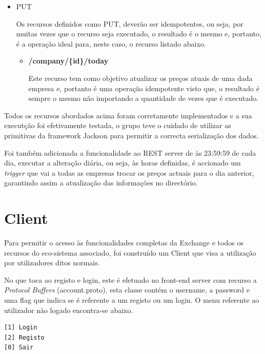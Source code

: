 \documentclass[a4paper,12pt]{article}
\begin{document}
\begin{itemize}
\begin{itemize}
    
  \end{itemize}
\item PUT
  \par Os recursos definidos como PUT, deverão ser idempotentes, ou seja, por muitas vezes que o recurso seja executado, o resultado é o mesmo e, portanto, é a operação ideal para, neste caso, o recurso listado abaixo.
  \begin{itemize}
    \item \textbf{/company/\{id\}/today}

    \par Este recurso tem como objetivo atualizar os preços atuais de uma dada empresa e, portanto é uma operação idempotente visto que, o resultado é sempre o mesmo não importando a quantidade de vezes que é executado.
  \end{itemize}
\end{itemize}

\par Todos os recursos abordados acima foram corretamente implementados e a sua executção foi efetivamente testada, o grupo teve o cuidado de utilizar as primitivas da framework Jackson para permitir a correcta serialização dos dados.
\par Foi também adicionada a funcionalidade ao REST server de às 23:59:59 de cada dia, executar a alteração diária, ou seja, às horas definidas, é accionado um \textit{trigger} que vai a todas as empresas trocar os preços actuais para o dia anterior, garantindo assim a atualização das informações no directório.

\section{Client}
Para permitir o acesso às funcionalidades completas da Exchange e todos os recursos do eco-sistema associado, foi construído um Client que visa a utilização por utilizadores ditos normais.

\par No que toca ao registo e login, este é efetuado no front-end server com recurso a \textit{Protocol Buffers} (account.proto), esta classe contém o username, a password e uma flag que indica se é referente a um registo ou um login. O menu referente ao utilizador não logado encontra-se abaixo.

\begin{verbatim}
[1] Login
[2] Registo
[0] Sair
\end{verbatim}
\end{document}
